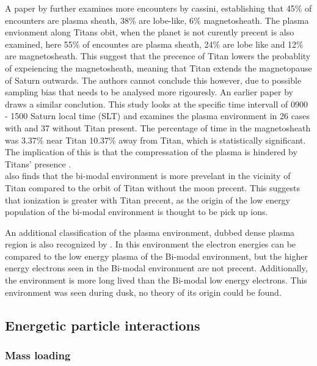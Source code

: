 \documentclass[12pt, parskip=full*, abstract]{scrartcl}
\begin{document}
A paper by \textcite{Smith-WithOrWithoutTitan} further examines more encounters by cassini, establishing that 45\% of encounters are plasma sheath, 38\% are lobe-like, 6\% magnetosheath. The plasma envionment along Titans obit, when the planet is not curently precent is also examined, here 55\% of encountes are plasma sheath, 24\% are lobe like and 12\% are magnetosheath. This suggest that the precence of Titan lowers the probablity of expeiencing the magnetosheath, meaning that Titan extends the magnetopause of Saturn outwards. The authors cannot conclude this however, due to possible sampling bias that needs to be analysed more rigouresly. An earlier paper by \textcite{Wei-WithOrWithoutTitan} draws a similar conclution. This study looks at the specific time intervall of 0900 - 1500 Saturn local time (SLT) and examines the plasma environment in 26 cases with and 37 without Titan present. The percentage of time in the magnetosheath was 3.37\% near Titan 10.37\% away from Titan, which is statistically significant. The implication of this is that the compressation of the plasma is hindered by Titans' presence \parencite{Wei-WithOrWithoutTitan}.  \\
\textcite{Smith-WithOrWithoutTitan} also finds that the bi-modal environment is more prevelant in the vicinity of Titan compared to the orbit of Titan without the moon precent. This suggests that ionization is greater with Titan precent, as the origin of the low energy population of the bi-modal environment is thought to be pick up ions. 

An additional classification of the plasma environment, dubbed dense plasma region is also recognized by \textcite{Smith-WithOrWithoutTitan}. In this environment the electron energies can be compared to the low energy plasma of the Bi-modal environment, but the higher energy electrons seen in the Bi-modal environment are not precent. Additionally, the environment is more long lived than the Bi-modal low energy electrons. This environment was seen during dusk, no theory of its origin could be found.%



\subsection{Energetic particle interactions}

\subsubsection{Mass loading}
\end{document}
